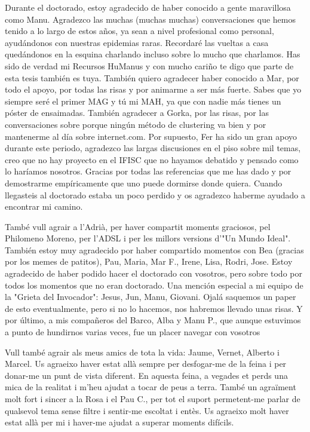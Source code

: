 Durante el doctorado, estoy agradecido de haber conocido a gente maravillosa como Manu. Agradezco las muchas (muchas muchas) conversaciones que hemos tenido a lo largo de estos años, ya sean a nivel profesional como personal, ayudándonos con nuestras epidemias raras. Recordaré las vueltas a casa quedándonos en la esquina charlando incluso sobre lo mucho que charlamos. Has sido de verdad mi Recursos HuManus y con mucho cariño te digo que parte de esta tesis también es tuya. También quiero agradecer haber conocido a Mar, por todo el apoyo, por todas las risas y por animarme a ser más fuerte. Sabes que yo siempre seré el primer MAG y tú mi MAH, ya que con nadie más tienes un póster de ensaimadas. También agradecer a Gorka, por las risas, por las conversaciones sobre porque ningún método de clustering va bien y por mantenerme al día sobre internet.com. Por supuesto, Fer ha sido un gran apoyo durante este periodo, agradezco las largas discusiones en el piso sobre mil temas, creo que no hay proyecto en el IFISC que no hayamos debatido y pensado como lo haríamos nosotros. Gracias por todas las referencias que me has dado y por demostrarme empíricamente que uno puede dormirse donde quiera. Cuando llegasteis al doctorado estaba un poco perdido y os agradezco haberme ayudado a encontrar mi camino.

També vull agrair a l'Adrià, per haver compartit moments graciosos, pel Philomeno Moreno, per l'ADSL i per les millors versions d'"Un Mundo Ideal". También estoy muy agradecido por haber compartido momentos con Bea (gracias por los memes de patitos), Pau, Maria, Mar F., Irene, Lisa, Rodri, Jose. Estoy agradecido de haber podido hacer el doctorado con vosotros, pero sobre todo por todos los momentos que no eran doctorado. Una mención especial a mi equipo de la "Grieta del Invocador": Jesus, Jun, Manu, Giovani. Ojalá saquemos un paper de esto eventualmente, pero si no lo hacemos, nos habremos llevado unas risas. Y por último, a mis compañeros del Barco, Alba y Manu P., que aunque estuvimos a punto de hundirnos varias veces, fue un placer navegar con vosotros

Vull també agrair als meus amics de tota la vida: Jaume, Vernet, Alberto i Marcel. Us agraeixo haver estat allà sempre per desfogar-me de la feina i per donar-me un punt de vista diferent. En aquesta feina, a vegades et perds una mica de la realitat i m'heu ajudat a tocar de peus a terra. També un agraïment molt fort i sincer a la Rosa i el Pau C., per tot el suport permetent-me parlar de qualsevol tema sense filtre i sentir-me escoltat i entès. Us agraeixo molt haver estat allà per mi i haver-me ajudat a superar moments difícils.

